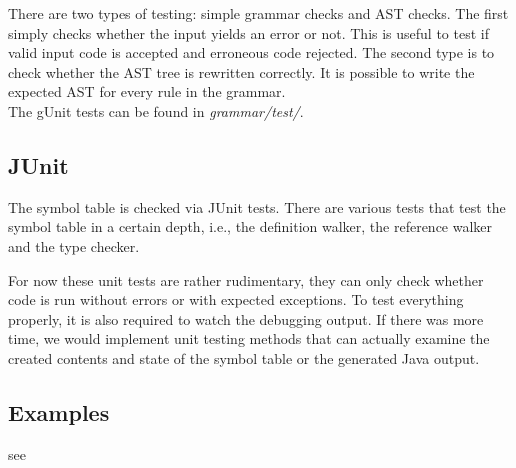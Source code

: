There are two types of testing: simple grammar checks and AST checks. The
first simply checks whether the input yields an error or not. This is useful
to test if valid input code is accepted and erroneous code rejected. The
second type is to check whether the AST tree is rewritten correctly. It is
possible to write the expected AST for every rule in the grammar.\\

The gUnit tests can be found in \emph{grammar/test/}.


\subsection{JUnit}
The symbol table is checked via JUnit tests. There are various tests that
test the symbol table in a certain depth, i.e., the definition walker, the
reference walker and the type checker.

For now these unit tests are rather rudimentary, they can only check whether
code is run without errors or with expected exceptions. To test everything
properly, it is also required to watch the debugging output.
If there was more time, we would implement unit testing methods that can
actually examine the created contents and state of the symbol table or the
generated Java output.

\subsection{Examples}
see 
